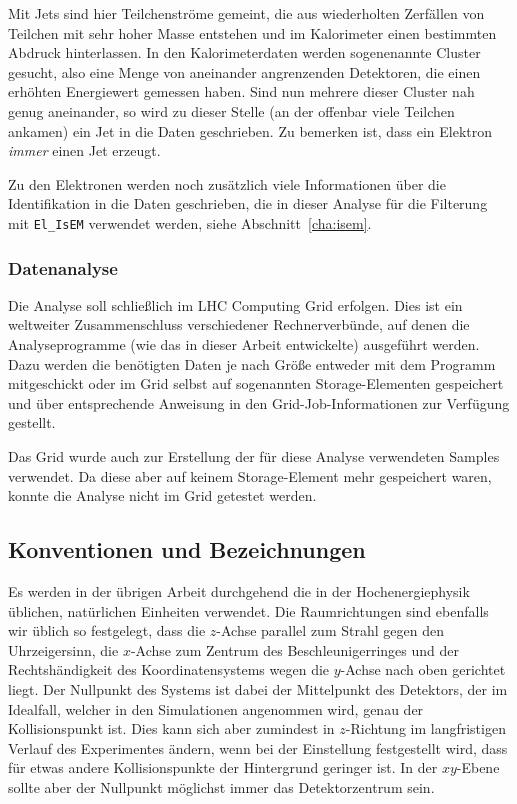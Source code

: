 \label{jet-recon}
Mit Jets sind hier Teilchenströme gemeint, die aus wiederholten Zerfällen von
Teilchen mit sehr hoher Masse entstehen und im Kalorimeter einen bestimmten
Abdruck hinterlassen. In den Kalorimeterdaten werden sogenenannte Cluster
gesucht, also eine Menge von aneinander angrenzenden Detektoren, die einen
erhöhten Energiewert gemessen haben. Sind nun mehrere dieser Cluster nah genug
aneinander, so wird zu dieser Stelle (an der offenbar viele Teilchen ankamen)
ein Jet in die Daten geschrieben. Zu bemerken ist, dass ein Elektron
\emph{immer} einen Jet erzeugt.

Zu den Elektronen werden noch zusätzlich viele Informationen über die
Identifikation in die Daten geschrieben, die in dieser Analyse für die Filterung
mit \lstinline'El_IsEM' verwendet werden, siehe Abschnitt~\ref{cha:isem}.

\subsubsection{Datenanalyse}
Die Analyse soll schließlich im LHC Computing Grid erfolgen. Dies ist ein
weltweiter Zusammenschluss verschiedener Rechnerverbünde, auf denen die
Analyseprogramme (wie das in dieser Arbeit entwickelte) ausgeführt werden. Dazu
werden die benötigten Daten je nach Größe entweder mit dem Programm mitgeschickt
oder im Grid selbst auf sogenannten Storage-Elementen gespeichert und über
entsprechende Anweisung in den Grid-Job-Informationen zur Verfügung gestellt.

Das Grid wurde auch zur Erstellung der für diese Analyse verwendeten Samples
verwendet. Da diese aber auf keinem Storage-Element mehr gespeichert waren,
konnte die Analyse nicht im Grid getestet werden.

\subsection{Konventionen und Bezeichnungen}
\label{cha:conv}
Es werden in der übrigen Arbeit durchgehend die in der Hochenergiephysik
üblichen, natürlichen Einheiten verwendet. Die Raumrichtungen sind ebenfalls wir
üblich so festgelegt, dass die $z$-Achse parallel zum Strahl gegen den
Uhrzeigersinn, die $x$-Achse zum Zentrum des Beschleunigerringes und der
Rechtshändigkeit des Koordinatensystems wegen die $y$-Achse nach oben gerichtet
liegt.  Der Nullpunkt des Systems ist dabei der Mittelpunkt des Detektors, der
im Idealfall, welcher in den Simulationen angenommen wird, genau der
Kollisionspunkt ist.  Dies kann sich aber zumindest in $z$-Richtung im
langfristigen Verlauf des Experimentes ändern, wenn bei der Einstellung
festgestellt wird, dass für etwas andere Kollisionspunkte der Hintergrund
geringer ist. In der $xy$-Ebene sollte aber der Nullpunkt möglichst immer das
Detektorzentrum sein.

